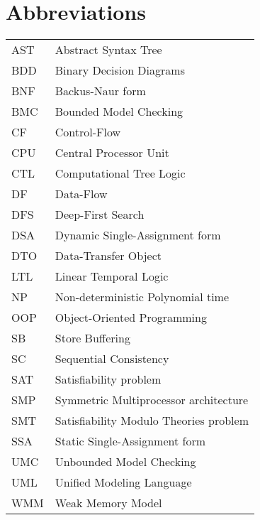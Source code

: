 \documentclass[12pt,a4paper,oneside,pdftex]{report}
\theoremstyle{definition}
\begin{document}
\chapter*{Abbreviations}
\noindent
\begin{longtable}{@{}p{}p{}@{}}
AST & Abstract Syntax Tree \\
BDD & Binary Decision Diagrams \\
BNF & Backus-Naur form \\
BMC & Bounded Model Checking \\
CF  & Control-Flow \\
CPU & Central Processor Unit \\
CTL & Computational Tree Logic \\
DF  & Data-Flow \\
DFS & Deep-First Search \\
DSA & Dynamic Single-Assignment form \\
DTO & Data-Transfer Object \\
LTL & Linear Temporal Logic \\
NP  & Non-deterministic Polynomial time \\
OOP & Object-Oriented Programming \\
SB  & Store Buffering \\
SC  & Sequential Consistency \\
SAT & Satisfiability problem \\
SMP & Symmetric Multiprocessor architecture \\
SMT & Satisfiability Modulo Theories problem \\
SSA & Static Single-Assignment form \\
UMC & Unbounded Model Checking \\
UML & Unified Modeling Language \\
WMM & Weak Memory Model \\
\end{longtable}


\cleardoublepage
\tableofcontents
\end{document}
